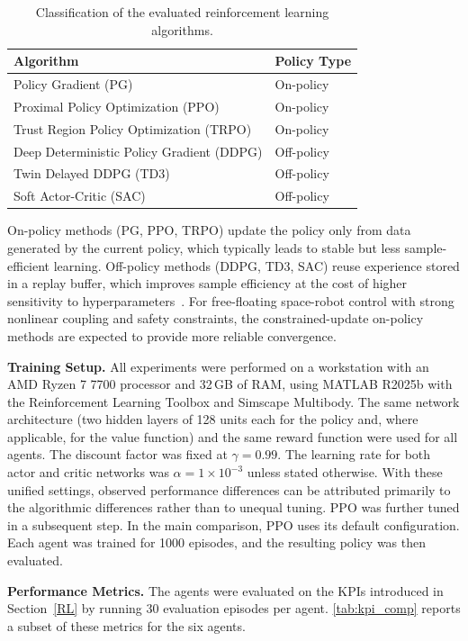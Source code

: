 \documentclass{ieeeaccess}
\begin{document}
\begin{table}[!t]
\centering
\caption{Classification of the evaluated reinforcement learning algorithms.}
\label{tab:on_off_policy}
\begin{tabular}{ll}
\toprule
\textbf{Algorithm} & \textbf{Policy Type} \\
\midrule
Policy Gradient (PG) & On-policy \\
Proximal Policy Optimization (PPO) & On-policy  \\
Trust Region Policy Optimization (TRPO) & On-policy  \\
Deep Deterministic Policy Gradient (DDPG) & Off-policy  \\
Twin Delayed DDPG (TD3) & Off-policy  \\
Soft Actor-Critic (SAC) & Off-policy  \\
\bottomrule
\end{tabular}
\end{table}
On-policy methods (PG, PPO, TRPO) update the policy only from data generated by the
current policy, which typically leads to stable but less sample-efficient learning. Off-policy methods (DDPG,
TD3, SAC) reuse experience stored in a replay buffer, which improves sample efficiency at
the cost of higher sensitivity to hyperparameters~\cite{b2,b7}. For free-floating space-robot control with strong nonlinear
coupling and safety constraints, the constrained-update on-policy methods are expected to provide more reliable
convergence.

\textbf{Training Setup.} All experiments were performed on a workstation with an AMD Ryzen 7
7700 processor and 32\,GB of RAM, using MATLAB R2025b with the Reinforcement Learning Toolbox
and Simscape Multibody. The same network architecture (two hidden layers of 128 units each
for the policy and, where applicable, for the value function) and the same reward
function were used for all agents. The discount factor was fixed at $\gamma = 0.99$.
The learning rate for both actor and critic networks was $\alpha = 1 \times 10^{-3}$
unless stated otherwise. With these unified settings, observed performance differences can be attributed primarily
to the algorithmic differences rather than to unequal tuning. PPO was further tuned in
a subsequent step. In the main comparison, PPO uses its default configuration. Each agent
was trained for 1000 episodes, and the resulting policy was then evaluated.

\textbf{Performance Metrics.} The agents were evaluated on the KPIs introduced in Section~\ref{RL} by running
30 evaluation episodes per agent. \autoref{tab:kpi_comp} reports a subset of these metrics for the
six agents.
\end{document}
